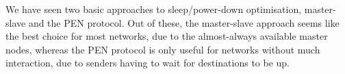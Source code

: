 \documentclass[conference]{IEEEtran}
\begin{document}
We have seen two basic approaches to sleep/power-down optimisation, master-slave
and the PEN protocol. Out of these, the master-slave approach seems like the
best choice for most networks, due to the almost-always available master nodes,
whereas the PEN protocol is only useful for networks without much interaction,
due to senders having to wait for destinations to be up.





\end{document}
